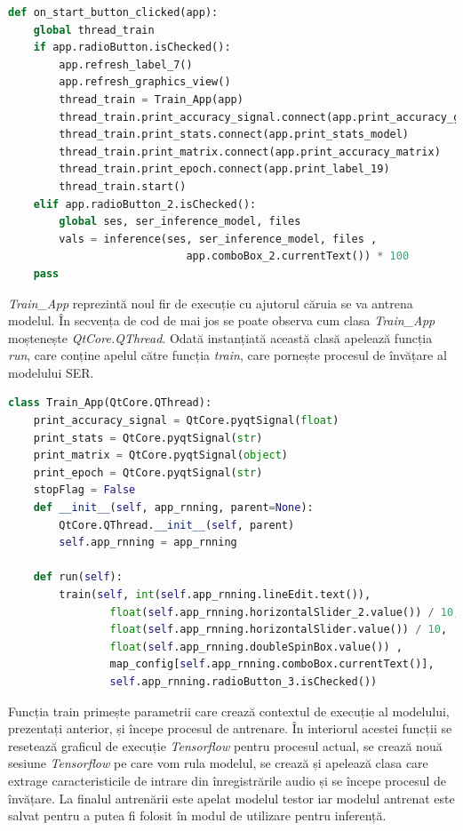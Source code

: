 \documentclass[a4paper,12pt]{book}
\begin{document}
		\begin{lstlisting}[language=Python, caption={Metoda interfeței grafice apelată automat în urma apăsării butonului Start.}, label=on_click]	
def on_start_button_clicked(app):
	global thread_train
	if app.radioButton.isChecked():
		app.refresh_label_7()
		app.refresh_graphics_view()
		thread_train = Train_App(app)
		thread_train.print_accuracy_signal.connect(app.print_accuracy_graph)
		thread_train.print_stats.connect(app.print_stats_model)
		thread_train.print_matrix.connect(app.print_accuracy_matrix)
		thread_train.print_epoch.connect(app.print_label_19)
		thread_train.start()
	elif app.radioButton_2.isChecked():
		global ses, ser_inference_model, files
		vals = inference(ses, ser_inference_model, files ,
							app.comboBox_2.currentText()) * 100
	pass \end{lstlisting}
		\textit{Train\_App} reprezintă noul fir de execuție cu ajutorul căruia se va antrena modelul. În secvența de cod de mai jos se poate observa cum clasa \textit{Train\_App} moștenește \textit{QtCore.QThread}. Odată instanțiată această clasă apelează funcția \textit{run}, care conține apelul către funcția \textit{train}, care pornește procesul de învățare al modelului SER.
		\begin{lstlisting}[language=Python, caption={Clasa aferentă firului de execuție pentru procesul de antrenare.}]	
class Train_App(QtCore.QThread):
	print_accuracy_signal = QtCore.pyqtSignal(float)
	print_stats = QtCore.pyqtSignal(str)
	print_matrix = QtCore.pyqtSignal(object)
	print_epoch = QtCore.pyqtSignal(str)
	stopFlag = False
	def __init__(self, app_rnning, parent=None):
		QtCore.QThread.__init__(self, parent)
		self.app_rnning = app_rnning
		
	def run(self):
		train(self, int(self.app_rnning.lineEdit.text()),
				float(self.app_rnning.horizontalSlider_2.value()) / 10,  
				float(self.app_rnning.horizontalSlider.value()) / 10, 
				float(self.app_rnning.doubleSpinBox.value()) ,
				map_config[self.app_rnning.comboBox.currentText()], 
				self.app_rnning.radioButton_3.isChecked()) \end{lstlisting}
		Funcția train primește parametrii care crează contextul de execuție al modelului, prezentați anterior, și începe procesul de antrenare. În interiorul acestei funcții se resetează graficul de execuție \textit{Tensorflow} pentru procesul actual, se crează nouă sesiune \textit{Tensorflow}  pe care vom rula modelul, se crează și apelează clasa care extrage caracteristicile de intrare din înregistrările audio și se începe procesul de învățare. La finalul antrenării este apelat modelul testor iar modelul antrenat este salvat pentru a putea fi folosit în modul de utilizare pentru inferență. \par
		
\end{document}
